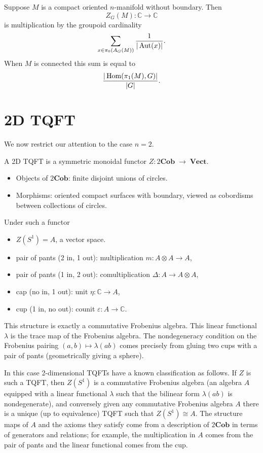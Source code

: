 \documentclass[12pt]{article}
\begin{document}
\begin{example}
Suppose $M$ is a compact oriented $n$-manifold without boundary. Then 
\[
Z_G(M) : \mathbb{C} \to \mathbb{C}
\]
is multiplication by the groupoid cardinality
\[
\sum_{x \in \pi_0(A_G(M))} \frac{1}{|\operatorname{Aut}(x)|}.
\]
When $M$ is connected this sum is equal to
\[
\frac{|\operatorname{Hom}(\pi_1(M),G)|}{|G|}.
\]
\end{example}
\section{2D TQFT}
We now restrict our attention to the case $n=2$.

A 2D TQFT is a symmetric monoidal functor
$Z : 2\mathbf{Cob} \;\to\; \mathbf{Vect}$.
\begin{itemize}
    \item Objects of $2\mathbf{Cob}$: finite disjoint unions of circles.
    \item Morphisms: oriented compact surfaces with boundary, viewed as cobordisms between collections of circles.
\end{itemize}

Under such a functor
\begin{itemize}
    \item $Z(S^1) = A$, a vector space.
    \item pair of pants (2 in, 1 out): multiplication $m:A\otimes A\to A$,
    \item pair of pants (1 in, 2 out): comultiplication $\Delta:A\to A\otimes A$,
    \item cap (no in, 1 out): unit $\eta:\mathbb{C}\to A$,
    \item cup (1 in, no out): counit $\varepsilon:A\to\mathbb{C}$.
\end{itemize}
This structure is exactly a commutative Frobenius algebra. This linear functional $\lambda$ is the trace map of the Frobenius algebra. The nondegeneracy condition on the Frobenius pairing $(a,b)\mapsto \lambda(ab)$ comes precisely from gluing two cups with a pair of pants (geometrically giving a sphere).

In this case 2-dimensional TQFTs have a known classification as follows. If $Z$ is such a TQFT, then $Z(S^1)$ is a commutative Frobenius algebra (an algebra $A$ equipped with a linear functional $\lambda$ such that the bilinear form $\lambda(ab)$ is nondegenerate), and conversely given any commutative Frobenius algebra $A$ there is a unique (up to equivalence) TQFT such that $Z(S^1)\cong A$. The structure maps of $A$ and the axioms they satisfy come from a description of $2\mathbf{Cob}$ in terms of generators and relations; for example, the multiplication in $A$ comes from the pair of pants and the linear functional comes from the cup.
\end{document}
